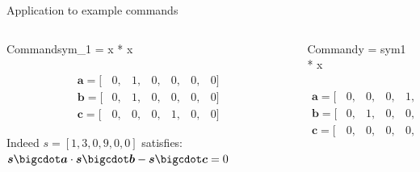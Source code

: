 \documentclass[handout]{beamer}
\begin{document}
\begin{frame}{Application to example commands}   
    \begin{columns}[T] %
    \begin{column}{.48\textwidth}
        \begin{block}{Command}sym_1 = x * x\end{block}
        
        \begin{align*}        
             [ &one,&x,&out,&sym_1,&y,&sym_2 ]\\
             \bm{a} = [&0,&1,&0,&0,&0,&0]  \\
             \bm{b} = [&0,&1,&0,&0,&0,&0]  \\
             \bm{c} = [&0,&0,&0,&1,&0,&0] 
        \end{align*}
        
        Indeed $s = [1,3,0,9,0,0]$ satisfies: $\bm{s} \bigcdot \bm{a} \cdot \bm{s} \bigcdot \bm{b} - \bm{s} \bigcdot \bm{c} = 0$   
    \end{column}%
    \hfill%
    \begin{column}{.48\textwidth}
        \begin{block}{Command}y = sym1 * x\end{block}
        
        \begin{align*}        
              [ &one,&x,&out,&sym_1,&y,&sym_2 ]\\
             \bm{a} = [&0,&0,&0,&1,&0,&0]  \\
             \bm{b} = [&0,&1,&0,&0,&0,&0]  \\
             \bm{c} = [&0,&0,&0,&0,&1,&0] 
        \end{align*}    
\end{column}%
\end{columns} 
\end{frame}
\end{document}
